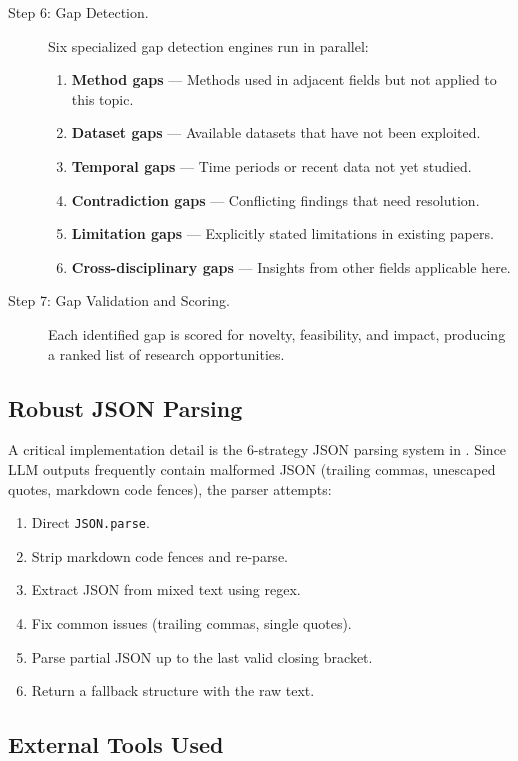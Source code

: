 \begin{description}
  \item[Step 6: Gap Detection.] Six specialized gap detection engines run in parallel:
  \begin{enumerate}
    \item \textbf{Method gaps} --- Methods used in adjacent fields but not applied to this topic.
    \item \textbf{Dataset gaps} --- Available datasets that have not been exploited.
    \item \textbf{Temporal gaps} --- Time periods or recent data not yet studied.
    \item \textbf{Contradiction gaps} --- Conflicting findings that need resolution.
    \item \textbf{Limitation gaps} --- Explicitly stated limitations in existing papers.
    \item \textbf{Cross-disciplinary gaps} --- Insights from other fields applicable here.
  \end{enumerate}

  \item[Step 7: Gap Validation and Scoring.] Each identified gap is scored for novelty, feasibility, and impact, producing a ranked list of research opportunities.
\end{description}

\subsection{Robust JSON Parsing}

A critical implementation detail is the 6-strategy JSON parsing system in . Since LLM outputs frequently contain malformed JSON (trailing commas, unescaped quotes, markdown code fences), the parser attempts:

\begin{enumerate}
  \item Direct \texttt{JSON.parse}.
  \item Strip markdown code fences and re-parse.
  \item Extract JSON from mixed text using regex.
  \item Fix common issues (trailing commas, single quotes).
  \item Parse partial JSON up to the last valid closing bracket.
  \item Return a fallback structure with the raw text.
\end{enumerate}

\subsection{External Tools Used}

